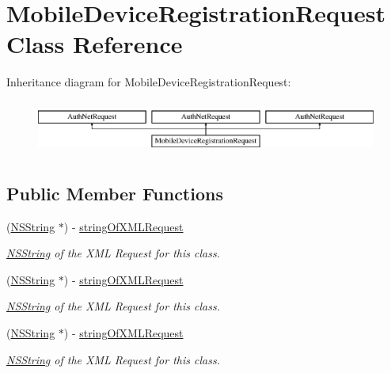 \hypertarget{interface_mobile_device_registration_request}{
\section{MobileDeviceRegistrationRequest Class Reference}
\label{interface_mobile_device_registration_request}
}
Inheritance diagram for MobileDeviceRegistrationRequest:\begin{figure}[H]
\begin{center}
\leavevmode
\includegraphics[height=1.794872cm]{interface_mobile_device_registration_request}
\end{center}
\end{figure}
\subsection*{Public Member Functions}
\begin{DoxyCompactItemize}
\item 
(\hyperlink{class_n_s_string}{NSString} $\ast$) -\/ \hyperlink{interface_mobile_device_registration_request_a023178b693465c21f5c8959bfd1aea4e}{stringOfXMLRequest}
\begin{DoxyCompactList}\small\item\em \hyperlink{class_n_s_string}{NSString} of the XML Request for this class. \item\end{DoxyCompactList}\item 
(\hyperlink{class_n_s_string}{NSString} $\ast$) -\/ \hyperlink{interface_mobile_device_registration_request_a023178b693465c21f5c8959bfd1aea4e}{stringOfXMLRequest}
\begin{DoxyCompactList}\small\item\em \hyperlink{class_n_s_string}{NSString} of the XML Request for this class. \item\end{DoxyCompactList}\item 
(\hyperlink{class_n_s_string}{NSString} $\ast$) -\/ \hyperlink{interface_mobile_device_registration_request_a023178b693465c21f5c8959bfd1aea4e}{stringOfXMLRequest}
\begin{DoxyCompactList}\small\item\em \hyperlink{class_n_s_string}{NSString} of the XML Request for this class. \item\end{DoxyCompactList}\end{DoxyCompactItemize}
